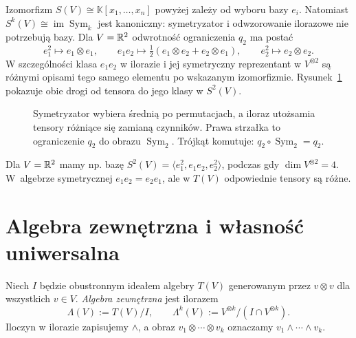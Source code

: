 Izomorfizm $S(V)\cong\mathbb K[x_1,\ldots,x_n]$ powyżej zależy
od wyboru bazy $e_i$. Natomiast
$S^k(V)\cong\operatorname{im}\operatorname{Sym}_k$ jest kanoniczny:
symetryzator i odwzorowanie ilorazowe nie potrzebują bazy.
Dla $V=\mathbb{R}^2$ odwrotność ograniczenia $q_2$ ma postać
\[
 e_1^2\longmapsto e_1\otimes e_1,\qquad
 e_1e_2\longmapsto\tfrac12(e_1\otimes e_2+e_2\otimes e_1),
 \qquad e_2^2\longmapsto e_2\otimes e_2.
\]
W szczególności klasa $e_1e_2$ w ilorazie i jej symetryczny
reprezentant w $V^{\otimes2}$ są różnymi opisami tego samego
elementu po wskazanym izomorfizmie.
Rysunek~\ref{fig:sym-iloraz} pokazuje obie drogi od tensora
do jego klasy w $S^2(V)$.
\begin{figure}[H]
\centering
{}
\caption{Symetryzator wybiera średnią po permutacjach,
a iloraz utożsamia tensory różniące się zamianą czynników.
Prawa strzałka to ograniczenie $q_2$ do obrazu $\operatorname{Sym}_2$.
Trójkąt komutuje: $q_2\circ\operatorname{Sym}_2=q_2$.}
\label{fig:sym-iloraz}
\end{figure}

Dla $V=\mathbb{R}^2$ mamy np. bazę
$S^2(V)=\langle e_1^2,e_1e_2,e_2^2\rangle$,
podczas gdy $\dim V^{\otimes2}=4$. W~algebrze symetrycznej
$e_1e_2=e_2e_1$, ale w $T(V)$ odpowiednie tensory są różne.

\section{Algebra zewnętrzna i własność uniwersalna}
\label{sec:algebra-zewnetrzna}

\begin{definicja}
\label{def:algebra-zewnetrzna}
Niech $I$ będzie obustronnym ideałem algebry $T(V)$
generowanym przez $v\otimes v$ dla wszystkich $v\in V$.
\emph{Algebra zewnętrzna} jest ilorazem
\[
 \Lambda(V):=T(V)/I,
 \qquad \Lambda^k(V):=V^{\otimes k}/(I\cap V^{\otimes k}).
\]
Iloczyn w ilorazie zapisujemy $\wedge$, a obraz
$v_1\otimes\cdots\otimes v_k$ oznaczamy
$v_1\wedge\cdots\wedge v_k$.
\end{definicja}

